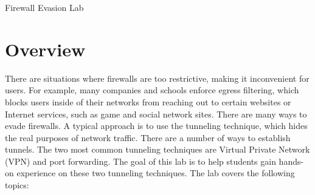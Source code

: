 
\newcommand{\commonfolder}{../../common-files}




\newcommand{\tunnelFigs}{./Figs}


\newcommand{\pointupright}[1]{\ding{218} \textbf{\texttt{#1}}}

\newcommand{\externalnet}{\texttt{10.8.0.0/24}\xspace}
\newcommand{\internalnet}{\texttt{192.168.20.0/24}\xspace}
\newcommand{\hostA}{\texttt{10.8.0.99}\xspace}
\newcommand{\hostB}{\texttt{192.168.20.99}\xspace}


\usepackage{hyperref}




\begin{center}
{\LARGE Firewall Evasion Lab}
\end{center}




\section{Overview}

There are situations where firewalls are too restrictive, making it inconvenient for
users. For example, many companies and schools enforce egress filtering,
which blocks users
inside of their networks from reaching out to certain websites or Internet services, such as
game and social network sites. There are many ways to evade firewalls. A typical
approach is to use the tunneling technique, which hides the real purposes of
network traffic. There are a number of ways to establish tunnels.
The two most common tunneling techniques are Virtual Private
Network (VPN) and port forwarding.
The goal of this lab is to help students gain hands-on experience on these 
two tunneling techniques. 
The lab covers the following topics:


